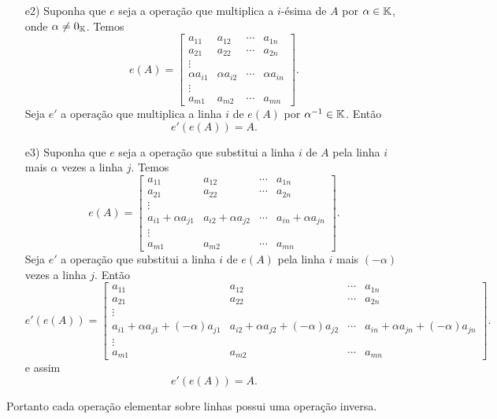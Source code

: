 \begin{prova}
\begin{enumerate}
		\item [e2)] Suponha que $e$ seja a opera\c{c}\~ao que multiplica a $i$-\'esima de $A$ por $\alpha \in \mathbb{K}$, onde $\alpha \ne 0_{\mathbb{K}}$. Temos
		\[
			e(A) =
				\begin{bmatrix}
					a_{11} & a_{12} & \cdots & a_{1n}\\
					a_{21} & a_{22} & \cdots & a_{2n}\\
					\vdots\\
					\alpha a_{i1} & \alpha a_{i2} & \cdots & \alpha a_{in}\\
					\vdots\\
					a_{m1} & a_{m2} & \cdots & a_{mn}
				\end{bmatrix}.
		\]
		Seja $e'$ a opera\c{c}\~ao que multiplica a linha $i$ de $e(A)$ por $\alpha^{-1} \in \mathbb{K}$. Ent\~ao
		\[
			e'(e(A)) = A.
		\]
		\item [e3)] Suponha que $e$ seja a opera\c{c}\~ao que substitui a linha $i$ de $A$ pela linha $i$ mais $\alpha$ vezes a linha $j$. Temos
		\[
			e(A) =
				\begin{bmatrix}
					a_{11} & a_{12} & \cdots & a_{1n}\\
					a_{21} & a_{22} & \cdots & a_{2n}\\
					\vdots\\
					a_{i1} + \alpha a_{j1} & a_{i2} + \alpha a_{j2} & \cdots & a_{in} + \alpha a_{jn}\\
					\vdots\\
					a_{m1} & a_{m2} & \cdots & a_{mn}
				\end{bmatrix}.
		\]
		Seja $e'$ a opera\c{c}\~ao que substitui a linha $i$ de $e(A)$ pela linha $i$ mais $(-\alpha)$ vezes a linha $j$. Ent\~ao
		\[
			e'(e(A)) =
					\begin{bmatrix}
						a_{11} & a_{12} & \cdots & a_{1n}\\
						a_{21} & a_{22} & \cdots & a_{2n}\\
						\vdots\\
						a_{i1} + \alpha a_{j1} + (-\alpha)a_{j1} & a_{i2} + \alpha a_{j2} + (-\alpha)a_{j2} & \cdots & a_{in} + \alpha a_{jn} + (-\alpha)a_{jn}\\
						\vdots\\
						a_{m1} & a_{m2} & \cdots & a_{mn}
					\end{bmatrix}.
		\]
		e assim
		\[
			e'(e(A)) = A.
		\]
	\end{enumerate}
	Portanto cada opera\c{c}\~ao elementar sobre linhas possui uma opera\c{c}\~ao inversa.
\end{prova}

